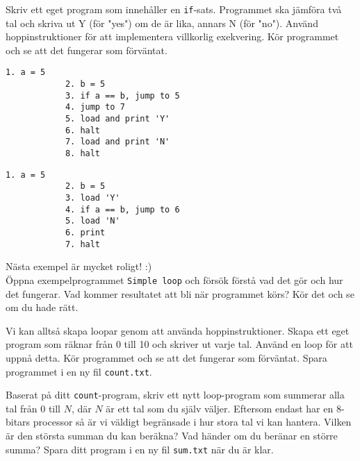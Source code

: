 \begin{Datorarbete}
    \item {} Skriv ett eget program som innehåller en \texttt{if}-sats. Programmet ska jämföra två tal och skriva ut Y (för "yes") om de är lika, annars N (för "no"). Använd hoppinstruktioner för att implementera villkorlig exekvering. Kör programmet och se att det fungerar som förväntat.

    \begin{minipage}[t]{0.42\textwidth}
        \begin{lstlisting}[xleftmargin=-15mm]
            1. a = 5
            2. b = 5
            3. if a == b, jump to 5
            4. jump to 7
            5. load and print 'Y'
            6. halt
            7. load and print 'N'
            8. halt
        \end{lstlisting}
    \end{minipage}
    \begin{minipage}[t]{0.42\textwidth}
        \begin{lstlisting}[xleftmargin=-15mm]
            1. a = 5
            2. b = 5
            3. load 'Y'
            4. if a == b, jump to 6
            5. load 'N'
            6. print
            7. halt
        \end{lstlisting}
    \end{minipage}

    \item {} Nästa exempel är mycket roligt! :) \\
    Öppna exempelprogrammet \texttt{Simple loop} och försök förstå vad det gör och hur det fungerar. Vad kommer resultatet att bli när programmet körs? Kör det och se om du hade rätt.

    \item {} Vi kan alltså skapa loopar genom att använda hoppinstruktioner. Skapa ett eget program som räknar från 0 till 10 och skriver ut varje tal. Använd en loop för att uppnå detta. Kör programmet och se att det fungerar som förväntat. Spara programmet i en ny fil \texttt{count.txt}.
    
    \item {} Baserat på ditt \texttt{count}-program, skriv ett nytt loop-program som summerar alla tal från 0 till \(N\), där \(N\) är ett tal som du själv väljer. Eftersom \progname{} endast har en 8-bitars processor så är vi väldigt begränsade i hur stora tal vi kan hantera. Vilken är den största summan du kan beräkna? Vad händer om du beränar en större summa? Spara ditt program i en ny fil \texttt{sum.txt} när du är klar.
\end{Datorarbete}


